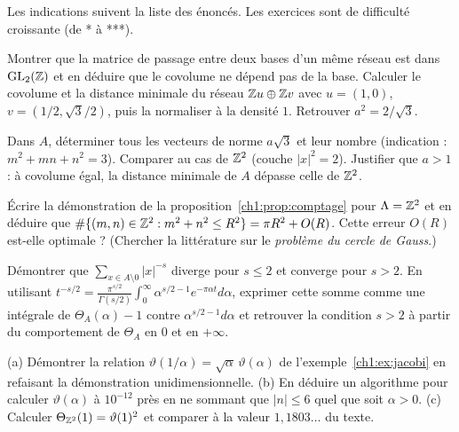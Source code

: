 Les indications suivent la liste des énoncés. Les exercices sont de difficulté croissante (de * à ***).

\begin{exercise}[*]\label{ch1:ex:covol}
Montrer que la matrice de passage entre deux bases d'un même réseau est dans $\mathrm{GL}_2(\mathbb{Z})$ et en déduire que le covolume ne dépend pas de la base.
Calculer le covolume et la distance minimale du réseau $\mathbb{Z} u\oplus\mathbb{Z} v$ avec $u=(1,0)$, $v=(1/2,\sqrt3/2)$, puis la normaliser à la densité $1$. Retrouver $a^2=2/\sqrt3$.
\end{exercise}

\begin{exercise}[*]\label{ch1:ex:voisins}
Dans $A$, déterminer tous les vecteurs de norme $a\sqrt3$ et leur nombre (indication : $m^2+mn+n^2=3$). Comparer au cas de $\mathbb{Z}^2$ (couche $|x|^2=2$). Justifier que $a>1$ : à covolume égal, la distance minimale de $A$ dépasse celle de $\mathbb{Z}^2$.
\end{exercise}

\begin{exercise}[**]\label{ch1:ex:comptage}
Écrire la démonstration de la proposition~\ref{ch1:prop:comptage} pour $\Lambda=\mathbb{Z}^2$ et en déduire que $\#\{(m,n)\in\mathbb{Z}^2 : m^2+n^2\le R^2\}=\pi R^2+O(R)$.
Cette erreur $O(R)$ est-elle optimale ? (Chercher la littérature sur le \emph{problème du cercle de Gauss}.)
\end{exercise}

\begin{exercise}[**]\label{ch1:ex:epstein}
Démontrer que $\sum_{x\in A\setminus0}|x|^{-s}$ diverge pour $s\le2$ et converge pour $s>2$. En utilisant $t^{-s/2}=\frac{\pi^{s/2}}{\Gamma(s/2)}\int_0^\infty\alpha^{s/2-1}e^{-\pi\alpha t}d\alpha$,
exprimer cette somme comme une intégrale de $\Theta_A(\alpha)-1$ contre $\alpha^{s/2-1}d\alpha$ et retrouver la condition $s>2$ à partir du comportement de $\Theta_A$ en $0$ et en $+\infty$.
\end{exercise}

\begin{exercise}[**]\label{ch1:ex:poisson}
(a) Démontrer la relation $\vartheta(1/\alpha)=\sqrt\alpha\,\vartheta(\alpha)$ de l'exemple~\ref{ch1:ex:jacobi} en refaisant la démonstration unidimensionnelle.
(b) En déduire un algorithme pour calculer $\vartheta(\alpha)$ à $10^{-12}$ près en ne sommant que $|n|\le 6$ quel que soit $\alpha>0$. (c) Calculer
$\Theta_{\mathbb{Z}^2}(1)=\vartheta(1)^2$ et comparer à la valeur $1{,}1803\ldots$ du texte.
\end{exercise}

